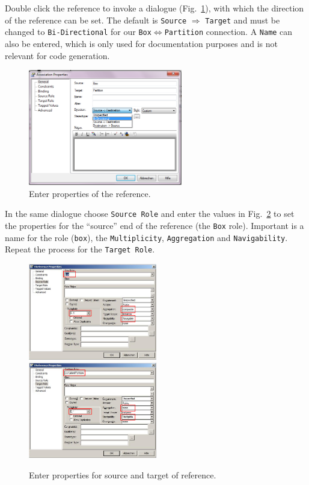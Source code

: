 Double click the reference to invoke a dialogue (Fig.~\ref{fig:ereference_properties}), with which the
direction of the reference can be set.  The default is \texttt{Source} $\Rightarrow$ \texttt{Target} and must be changed to \texttt{Bi-Directional} for our \texttt{Box}$\Leftrightarrow$\texttt{Partition} connection.
A \texttt{Name} can also be entered, which is only used for documentation
purposes and is not relevant for code generation.

\begin{figure}[htbp]
	\centering
  \includegraphics[width=0.6\textwidth]{pics/memBoxBilder/memBox25.png}
	\caption{Enter properties of the reference.}
	\label{fig:ereference_properties}
\end{figure}
	
\clearpage

In the same dialogue choose \texttt{Source Role} and enter the values in
Fig.~\ref{fig:reference_ends} to set the properties for the ``source''
end of the reference (the \texttt{Box} role).  Important is a name for the role
(\texttt{box}), the \texttt{Multiplicity}, \texttt{Aggregation} and
\texttt{Navigability}.  Repeat the process for the \texttt{Target Role}.
  
\begin{figure}[htbp]
	\centering 
  \includegraphics[width=0.5\textwidth]{pics/memBoxBilder/memBox26.png}\\
  \vspace{0.5cm}
  \includegraphics[width=0.5\textwidth]{pics/memBoxBilder/memBox27.png}
	\caption{Enter properties for source and target of reference.}
	\label{fig:reference_ends}
\end{figure}

